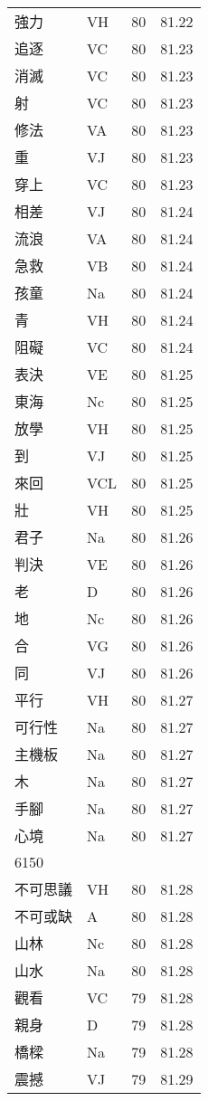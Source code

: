 \documentclass[twocolumn]{book}
\begin{document}
\begin{supertabular}{llrr}
強力 & VH & 80 &  81.22\\
追逐 & VC & 80 &  81.23\\
消滅 & VC & 80 &  81.23\\
射 & VC & 80 &  81.23\\
修法 & VA & 80 &  81.23\\
重 & VJ & 80 &  81.23\\
穿上 & VC & 80 &  81.23\\
相差 & VJ & 80 &  81.24\\
流浪 & VA & 80 &  81.24\\
急救 & VB & 80 &  81.24\\
孩童 & Na & 80 &  81.24\\
青 & VH & 80 &  81.24\\
阻礙 & VC & 80 &  81.24\\
表決 & VE & 80 &  81.25\\
東海 & Nc & 80 &  81.25\\
放學 & VH & 80 &  81.25\\
到 & VJ & 80 &  81.25\\
來回 & VCL & 80 &  81.25\\
壯 & VH & 80 &  81.25\\
君子 & Na & 80 &  81.26\\
判決 & VE & 80 &  81.26\\
老 & D & 80 &  81.26\\
地 & Nc & 80 &  81.26\\
合 & VG & 80 &  81.26\\
同 & VJ & 80 &  81.26\\
平行 & VH & 80 &  81.27\\
可行性 & Na & 80 &  81.27\\
主機板 & Na & 80 &  81.27\\
木 & Na & 80 &  81.27\\
手腳 & Na & 80 &  81.27\\
心境 & Na & 80 &  81.27\\
6150\\
不可思議 & VH & 80 &  81.28\\
不可或缺 & A & 80 &  81.28\\
山林 & Nc & 80 &  81.28\\
山水 & Na & 80 &  81.28\\
觀看 & VC & 79 &  81.28\\
親身 & D & 79 &  81.28\\
橋樑 & Na & 79 &  81.28\\
震撼 & VJ & 79 &  81.29\\

\end{supertabular}
\end{document}
